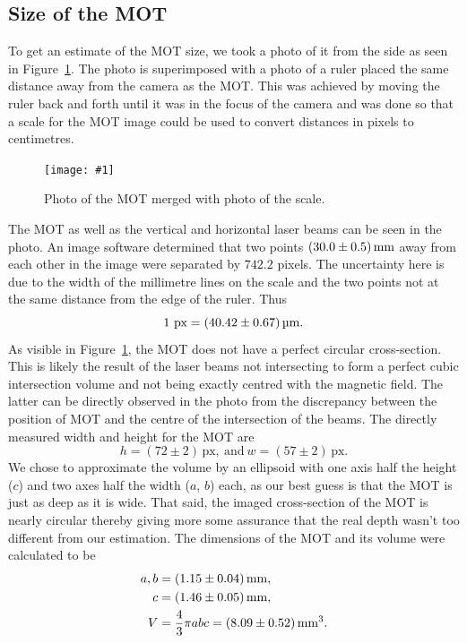 \documentclass[twocolumn]{article}
\newcommand{\insertFigure}[1]{%
   \texttt{[image: \#1]}%
}
\begin{document}
\subsection{Size of the MOT}
To get an estimate of the MOT size, we took a photo of it from the side as seen in Figure~\ref{fig:mot_w_scale}. The photo is superimposed with a photo of a ruler placed the same distance away from the camera as the MOT. This was achieved by moving the ruler back and forth until it was in the focus of the camera and was done so that a scale for the MOT image could be used to convert distances in pixels to centimetres.
\begin{figure} [!h]
	\centering
	\insertFigure{Images/MOT_w_scale_crop.png}
	\caption{Photo of the MOT merged with photo of the scale.}
	\label{fig:mot_w_scale}
\end{figure}
The MOT as well as the vertical and horizontal laser beams can be seen in the photo. An image software determined that two points $\SI[separate-uncertainty = true]{30.0 \pm 0.5 }{\milli\meter}$ away from each other in the image were separated by $742.2$ pixels. The uncertainty here is due to the width of the millimetre lines on the scale and the two points not at the same distance from the edge of the ruler. Thus
\begin{equation}
1 \text{~px} = \SI[separate-uncertainty = true]{40.42 \pm 0.67}{\micro\meter}. \nonumber
\end{equation}
As visible in Figure~\ref{fig:mot_w_scale}, the MOT does not have a perfect circular cross-section. This is likely the result of the laser beams not intersecting to form a perfect cubic intersection volume and not being exactly centred with the magnetic field. The latter can be directly observed in the photo from the discrepancy between the position of MOT and the centre of the intersection of the beams. The directly measured width and height for the MOT are
$$
h = (72 \pm 2)  \, \text{px}, \: \text{and} \: w = (57 \pm 2)  \, \text{px}.
$$
We chose to approximate the volume by an ellipsoid with one axis half the height ($c$) and two axes half the width ($a$, $b$) each, as our best guess is that the MOT is just as deep as it is wide. That said, the imaged cross-section of the MOT is nearly circular thereby giving more some assurance that the real depth wasn't too different from our estimation. The dimensions of the MOT and its volume were calculated to be
\begin{align*}
a, b &= \SI[separate-uncertainty = true]{1.15 \pm 0.04}{\milli\meter}, \\
c &=  \SI[separate-uncertainty = true]{1.46 \pm 0.05}{\milli\meter}, \\
V &= \frac{4}{3} \pi a b c = \SI[separate-uncertainty = true]{8.09 \pm 0.52 }{\cubic\milli\meter}.
\end{align*}
\end{document}
